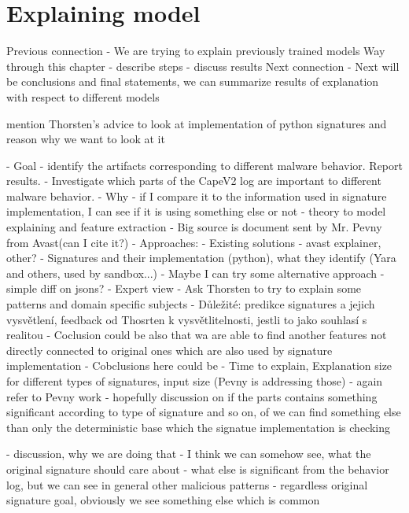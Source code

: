 \chapter{Explaining model}



Previous connection
- We are trying to explain previously trained models
Way through this chapter
- describe steps
- discuss results
Next connection
- Next will be conclusions and final statements, we can summarize results of explanation with respect to different models


mention Thorsten's advice to look at implementation of python signatures and reason why we want to look at it

- Goal 
- identify the artifacts corresponding to different malware behavior. Report results.
- Investigate which parts of the CapeV2 log are important to different malware behavior. 
- Why - if I compare it to the information used in signature implementation, I can see if it is using something else or not
- theory to model explaining and feature extraction - Big source is document sent by Mr. Pevny from Avast(can I cite it?)
- Approaches:
- Existing solutions - avast explainer, other?
- Signatures and their implementation (python), what they identify (Yara and others, used by sandbox...)
- Maybe I can try some alternative approach - simple diff on jsons?
- Expert view
  - Ask Thorsten to try to explain some patterns and domain specific subjects 
  - Důležité: predikce signatures a jejich vysvětlení, feedback od Thosrten k vysvětlitelnosti, jestli to jako souhlasí s realitou 
- Coclusion could be also that wa are able to find another features not directly connected to original ones which are also used by signature implementation
- Cobclusions here could be
- Time to explain, Explanation size for different types of signatures, input size (Pevny is addressing those)
- again refer to Pevny work
- hopefully discussion on if the parts contains something significant according to type of signature and so on, of we can find something else than only the deterministic base which the signatue implementation is checking



- discussion, why we are doing that - I think we can somehow see, what the original signature should care about - what else is significant from the behavior log, but we can see in general other malicious patterns - regardless original signature goal, obviously we see something else which is common